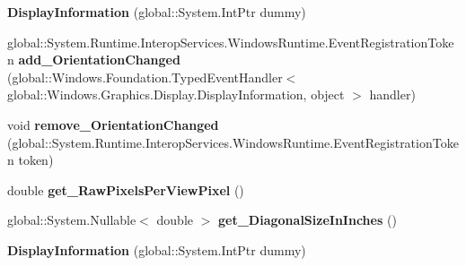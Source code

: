 \begin{DoxyCompactItemize}
{\bfseries Display\+Information} (global\+::\+System.\+Int\+Ptr dummy)
\item 
\mbox{\label{class_windows_1_1_graphics_1_1_display_1_1_display_information_ab25de6d82f535e3e82722b7b34a2e485}} 
global\+::\+System.\+Runtime.\+Interop\+Services.\+Windows\+Runtime.\+Event\+Registration\+Token {\bfseries add\+\_\+\+Orientation\+Changed} (global\+::\+Windows.\+Foundation.\+Typed\+Event\+Handler$<$ global\+::\+Windows.\+Graphics.\+Display.\+Display\+Information, object $>$ handler)
\item 
\mbox{\label{class_windows_1_1_graphics_1_1_display_1_1_display_information_a56bbdaab1ef2d9feb7c4b16d8d9f3a3a}} 
void {\bfseries remove\+\_\+\+Orientation\+Changed} (global\+::\+System.\+Runtime.\+Interop\+Services.\+Windows\+Runtime.\+Event\+Registration\+Token token)
\item 
\mbox{\label{class_windows_1_1_graphics_1_1_display_1_1_display_information_a9dc97c2bae189efb6b8e34a738397257}} 
double {\bfseries get\+\_\+\+Raw\+Pixels\+Per\+View\+Pixel} ()
\item 
\mbox{\label{class_windows_1_1_graphics_1_1_display_1_1_display_information_acf94f914fc79e6744c2000d54965e060}} 
global\+::\+System.\+Nullable$<$ double $>$ {\bfseries get\+\_\+\+Diagonal\+Size\+In\+Inches} ()
\item 
\mbox{\label{class_windows_1_1_graphics_1_1_display_1_1_display_information_a0cf7eebf1d214c165095e5dcf34c9b50}} 
{\bfseries Display\+Information} (global\+::\+System.\+Int\+Ptr dummy)
\end{DoxyCompactItemize}
